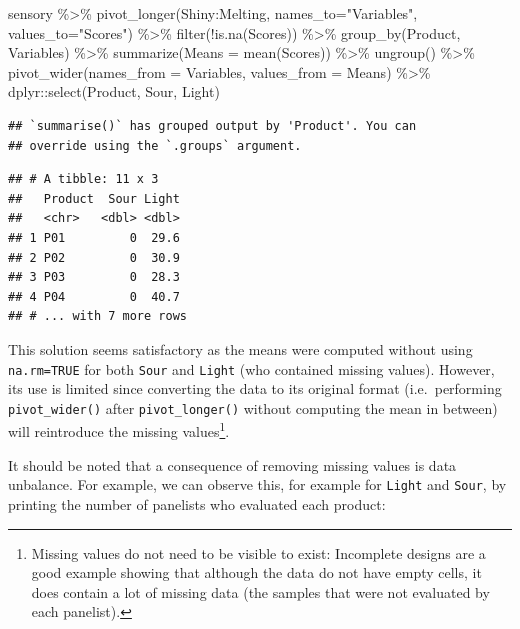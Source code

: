 \documentclass[
]{krantz}
\makeatletter
\newenvironment{Shaded}{\begin{snugshade}}{\end{snugshade}}
\newcommand{\AttributeTok}[1]{\textcolor[rgb]{0.61,0.61,0.61}{#1}}
\newcommand{\FunctionTok}[1]{\textcolor[rgb]{0,0,0}{#1}}
\newcommand{\NormalTok}[1]{#1}
\newcommand{\SpecialCharTok}[1]{\textcolor[rgb]{0,0,0}{#1}}
\newcommand{\StringTok}[1]{\textcolor[rgb]{0.5,0.5,0.5}{#1}}
\newenvironment{kframe}{%
\medskip{}
\setlength{\fboxsep}{.8em}
 \def\at@end@of@kframe{}%
 \ifinner\ifhmode%
  \def\at@end@of@kframe{\end{minipage}}%
  \begin{minipage}{\columnwidth}%
 \fi\fi%
 \def\FrameCommand##1{\hskip\@totalleftmargin \hskip-\fboxsep
 \colorbox{shadecolor}{##1}\hskip-\fboxsep
     \hskip-\linewidth \hskip-\@totalleftmargin \hskip\columnwidth}%
 \MakeFramed {\advance\hsize-\width
   \@totalleftmargin\z@ \linewidth\hsize
   \@setminipage}}%
 {\par\unskip\endMakeFramed%
 \at@end@of@kframe}
\renewenvironment{Shaded}{\begin{kframe}}{\end{kframe}}
\makeatother
\begin{document}
\begin{Shaded}
\begin{Highlighting}[]
\NormalTok{sensory }\SpecialCharTok{\%\textgreater{}\%} 
  \FunctionTok{pivot\_longer}\NormalTok{(Shiny}\SpecialCharTok{:}\NormalTok{Melting, }
               \AttributeTok{names\_to=}\StringTok{"Variables"}\NormalTok{, }\AttributeTok{values\_to=}\StringTok{"Scores"}\NormalTok{) }\SpecialCharTok{\%\textgreater{}\%} 
  \FunctionTok{filter}\NormalTok{(}\SpecialCharTok{!}\FunctionTok{is.na}\NormalTok{(Scores)) }\SpecialCharTok{\%\textgreater{}\%} 
  \FunctionTok{group\_by}\NormalTok{(Product, Variables) }\SpecialCharTok{\%\textgreater{}\%} 
  \FunctionTok{summarize}\NormalTok{(}\AttributeTok{Means =} \FunctionTok{mean}\NormalTok{(Scores)) }\SpecialCharTok{\%\textgreater{}\%} 
  \FunctionTok{ungroup}\NormalTok{() }\SpecialCharTok{\%\textgreater{}\%} 
  \FunctionTok{pivot\_wider}\NormalTok{(}\AttributeTok{names\_from =}\NormalTok{ Variables, }\AttributeTok{values\_from =}\NormalTok{ Means) }\SpecialCharTok{\%\textgreater{}\%} 
\NormalTok{  dplyr}\SpecialCharTok{::}\FunctionTok{select}\NormalTok{(Product, Sour, Light)}
\end{Highlighting}
\end{Shaded}

\begin{verbatim}
## `summarise()` has grouped output by 'Product'. You can
## override using the `.groups` argument.
\end{verbatim}

\begin{verbatim}
## # A tibble: 11 x 3
##   Product  Sour Light
##   <chr>   <dbl> <dbl>
## 1 P01         0  29.6
## 2 P02         0  30.9
## 3 P03         0  28.3
## 4 P04         0  40.7
## # ... with 7 more rows
\end{verbatim}

This solution seems satisfactory as the means were computed without using \texttt{na.rm=TRUE} for both \texttt{Sour} and \texttt{Light} (who contained missing values). However, its use is limited since converting the data to its original format (i.e.~performing \texttt{pivot\_wider()} after \texttt{pivot\_longer()} without computing the mean in between) will reintroduce the missing values\footnote{Missing values do not need to be visible to exist: Incomplete designs are a good example showing that although the data do not have empty cells, it does contain a lot of missing data (the samples that were not evaluated by each panelist).}.

It should be noted that a consequence of removing missing values is data unbalance. For example, we can observe this, for example for \texttt{Light} and \texttt{Sour}, by printing the number of panelists who evaluated each product:
\end{document}
